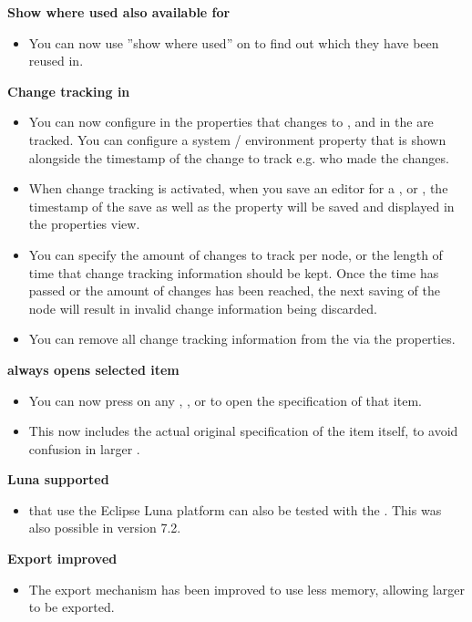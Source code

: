 \textbf{Show where used also available for \gdsuites{}}
\begin{itemize}
\item You can now use ''show where used'' on \gdsuites{} to find out which \gdjobs{} they have been reused in.
\end{itemize}

\textbf{Change tracking in \gdprojects{}}
\begin{itemize}
\item You can now configure in the \gdproject{} properties that changes to \gdcases{}, \gdsuites{} and \gdjobs{} in the \gdproject{} are tracked. You can configure a system / environment property that is shown alongside the timestamp of the change to track e.g. who made the changes. 
\item When change tracking is activated, when you save an editor for a \gdcase{}, \gdsuite{} or \gdjob{}, the timestamp of the save as well as the property will be saved and displayed in the properties view.
\item You can specify the amount of changes to track per node, or the length of time that change tracking information should be kept. Once the time has passed or the amount of changes has been reached, the next saving of the node will result in invalid change information being discarded.
\item You can remove all change tracking information from the \gdproject{} via the \gdproject{} properties. 
\end{itemize}

\textbf{ always opens selected item}
\begin{itemize}
\item You can now press  on any \gdcase{}, \gdsuite{}, or \gdjob{} to open the specification of that item.
\item This now includes the actual original specification of the item itself, to avoid confusion in larger \gdprojects{}. 
\end{itemize}

\textbf{Luna \gdauts{} supported}
\begin{itemize}
\item \gdauts{} that use the Eclipse Luna platform can also be tested with the \ite{}. This was also possible in version 7.2.
\end{itemize}

\textbf{Export improved}
\begin{itemize}
\item The export mechanism has been improved to use less memory, allowing larger \gdprojects{} to be exported.
\end{itemize}
